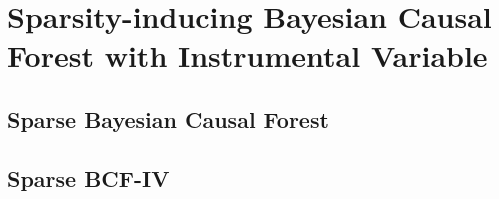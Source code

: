 \chapter{Sparsity-inducing Bayesian Causal Forest with
Instrumental Variable}

\section{Sparse Bayesian Causal Forest}


\section{Sparse BCF-IV}
